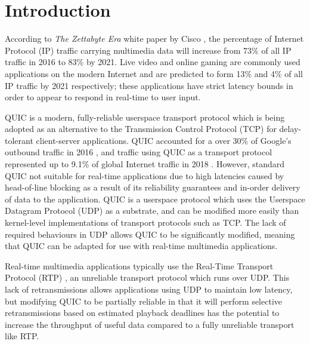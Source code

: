 \documentclass{mpaper}
\begin{document}
\section{Introduction}

%
According to \textit{The Zettabyte Era} white paper by Cisco \cite{CISCO2015}, the percentage of Internet Protocol (IP)\cite{IP-RFC} traffic carrying multimedia data will increase from 73\% of all IP traffic in 2016 to 83\% by 2021. Live video and online gaming are commonly used applications on the modern Internet and are predicted to form 13\% and 4\% of all IP traffic by 2021 respectively; these applications have strict latency bounds in order to appear to respond in real-time to user input.

QUIC is a modern, fully-reliable userspace transport protocol which is being adopted as an alternative to the Transmission Control Protocol (TCP)\cite{TCP-RFC} for delay-tolerant client-server applications. QUIC accounted for a over 30\% of Google's outbound traffic in 2016 \cite{Langley2017}, and traffic using QUIC as a transport protocol represented up to 9.1\% of global Internet traffic in 2018 \cite{Ruth2018}. However, standard QUIC not suitable for real-time applications due to high latencies caused by head-of-line blocking as a result of its reliability guarantees and in-order delivery of data to the application. QUIC is a userspace protocol which uses the Userspace Datagram Protocol (UDP) \cite{UDP-RFC} as a substrate, and can be modified more easily than kernel-level implementations of transport protocols such as TCP. The lack of required behaviours in UDP allows QUIC to be significantly modified, meaning that QUIC can be adapted for use with real-time multimedia applications.
  
Real-time multimedia applications typically use the Real-Time Transport Protocol (RTP) \cite{RTP-RFC}, an unreliable transport protocol which runs over UDP. This lack of retransmissions allows applications using UDP to maintain low latency, but modifying QUIC to be partially reliable in that it will perform selective retransmissions based on estimated playback deadlines has the potential to increase the throughput of useful data compared to a fully unreliable transport like RTP.
\end{document}
